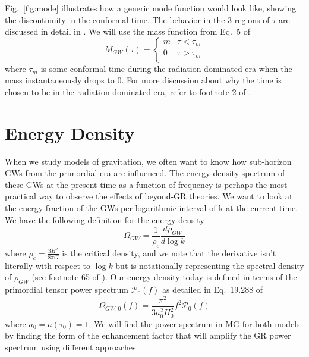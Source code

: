 \documentclass[prd,twocolumn,aps,psfig,nofootinbib,nobibnotes,superscriptaddress,preprintnumbers,times]{revtex4-2}
\begin{document}
Fig.\ \ref{fig:mode} illustrates how a generic mode function would look like, showing  the discontinuity in the conformal time. The behavior in the 3 regions of $\tau$ are discussed in detail in \cite{Fujita:2018}.
We will use the mass function from Eq.\ 5 of \cite{Fujita:2018}
\begin{equation}
    M_{GW}(\tau) = 
    \begin{cases}
            m & \tau < \tau_m \\
            0 & \tau > \tau_m \\
   \end{cases}
   \label{eqn:7}
\end{equation} 
where $\tau_m$ is some conformal time during the radiation dominated era when the mass instantaneously drops to 0. For more discussion about why the time is chosen to be in the radiation dominated era, refer to footnote 2 of \cite{Fujita:2018}. 

\section{Energy Density}
When we study models of gravitation, we often want to know how sub-horizon GWs from the primordial era are influenced. The energy density spectrum of these GWs at the present time as a function of frequency is perhaps the most practical way to observe the effects of beyond-GR theories. We want to look at the energy fraction of the GWs per logarithmic interval of k at the current time. We have the following definition for the energy density 
\begin{equation}\label{eqn:8}
    \Omega_{GW} = \frac{1}{\rho_c}\frac{d \rho_{GW}} {d \log{k}}
\end{equation}
where $\rho_c = \frac{3H^2}{8\pi G}$ is the critical density, and we note that the derivative isn't literally with respect to $\log k$ but is notationally representing the spectral density of $\rho_{GW}$ (see footnote 65 of \cite{Maggiore:v1}). Our energy density today is defined in terms of the primordial tensor power spectrum $\mathcal{P}_0(f)$ as detailed in Eq.\ 19.288 of \cite{Maggiore:v2}
\begin{equation}\label{eqn:9}
    \Omega_{GW,0}(f) = \frac{\pi^2}{3a_0^2H_0^2}f^2 \mathcal{P}_0(f)
\end{equation}
where $a_0 = a(\tau_0) = 1$. We will find the power spectrum in MG for both models by finding the form of the enhancement factor that will amplify the GR power spectrum using different approaches.  
\end{document}
